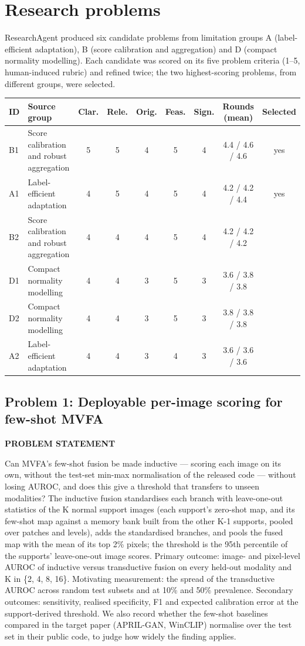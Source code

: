 \documentclass[11pt,a4paper]{article}
\newcommand{\lbl}[1]{{\sffamily\footnotesize\bfseries\color{muted}\MakeUppercase{#1}}\par}
\begin{document}
\section{Research problems}
ResearchAgent produced six candidate problems from limitation groups A (label-efficient adaptation), B (score calibration and aggregation) and D (compact normality modelling). Each candidate was scored on its five problem criteria (1–5, human-induced rubric) and refined twice; the two highest-scoring problems, from different groups, were selected.

\begin{tabularx}{\linewidth}{@{}l Y ccccc c c@{}}\toprule
ID & Source group & Clar. & Rele. & Orig. & Feas. & Sign. & Rounds (mean) & Selected\\\midrule
B1 & Score calibration and robust aggregation & 5 & 5 & 4 & 5 & 4 & 4.4 / 4.6 / 4.6 & yes\\
A1 & Label-efficient adaptation & 4 & 5 & 4 & 5 & 4 & 4.2 / 4.2 / 4.4 & yes\\
B2 & Score calibration and robust aggregation & 4 & 4 & 4 & 5 & 4 & 4.2 / 4.2 / 4.2 & \\
D1 & Compact normality modelling & 4 & 4 & 3 & 5 & 3 & 3.6 / 3.8 / 3.8 & \\
D2 & Compact normality modelling & 4 & 4 & 3 & 5 & 3 & 3.8 / 3.8 / 3.8 & \\
A2 & Label-efficient adaptation & 4 & 4 & 3 & 4 & 3 & 3.6 / 3.6 / 3.6 & \\
\bottomrule\end{tabularx}
\subsection{Problem 1: Deployable per-image scoring for few-shot MVFA}
\lbl{Problem statement}Can MVFA's few-shot fusion be made inductive — scoring each image on its own, without the test-set min-max normalisation of the released code — without losing AUROC, and does this give a threshold that transfers to unseen modalities? The inductive fusion standardises each branch with leave-one-out statistics of the K normal support images (each support's zero-shot map, and its few-shot map against a memory bank built from the other K-1 supports, pooled over patches and levels), adds the standardised branches, and pools the fused map with the mean of its top 2\% pixels; the threshold is the 95th percentile of the supports' leave-one-out image scores. Primary outcome: image- and pixel-level AUROC of inductive versus transductive fusion on every held-out modality and K in \{2, 4, 8, 16\}. Motivating measurement: the spread of the transductive AUROC across random test subsets and at 10\% and 50\% prevalence. Secondary outcomes: sensitivity, realised specificity, F1 and expected calibration error at the support-derived threshold. We also record whether the few-shot baselines compared in the target paper (APRIL-GAN, WinCLIP) normalise over the test set in their public code, to judge how widely the finding applies.
\end{document}
